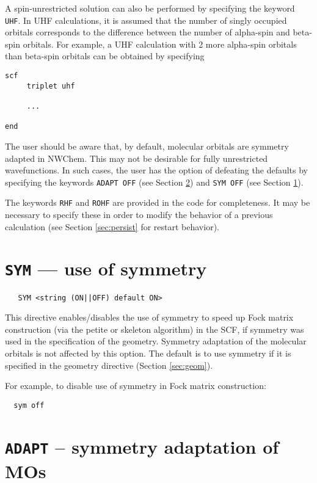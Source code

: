 A spin-unrestricted solution can also be performed by specifying the
keyword \verb+UHF+.  In UHF calculations, it is assumed that the
number of singly occupied orbitals corresponds to the difference
between the number of alpha-spin and beta-spin orbitals.  For example,
a UHF calculation with 2 more alpha-spin orbitals than beta-spin
orbitals can be obtained by specifying

\begin{verbatim}
scf
     triplet uhf

     ...

end
\end{verbatim}

The user should be aware that, by default, molecular orbitals are
symmetry adapted in NWChem.  This may not be desirable for fully
unrestricted wavefunctions.  In such cases, the user has the option of
defeating the defaults by specifying the keywords \verb+ADAPT OFF+
(see Section \ref{sec:adapt}) and \verb+SYM OFF+ (see Section
\ref{sec:sym}).

The keywords \verb+RHF+ and \verb+ROHF+ are provided in the code for
completeness. It may be necessary to specify these in order to modify
the behavior of a previous calculation (see Section \ref{sec:persist}
for restart behavior).

\section{{\tt SYM} --- use of symmetry}
\label{sec:sym}

 \begin{verbatim}
   SYM <string (ON||OFF) default ON>
 \end{verbatim}

This directive enables/disables the use of symmetry to speed up Fock matrix
construction (via the petite or skeleton algorithm) in the SCF, if
symmetry was used in the specification of the geometry.  Symmetry
adaptation of the molecular orbitals is not affected by this option.
The default is to use symmetry if it is specified in the geometry
directive (Section \ref{sec:geom}). 

For example, to disable use of symmetry in Fock matrix construction:
\begin{verbatim}
  sym off
\end{verbatim}

\section{{\tt ADAPT} -- symmetry adaptation of MOs}
\label{sec:adapt}

